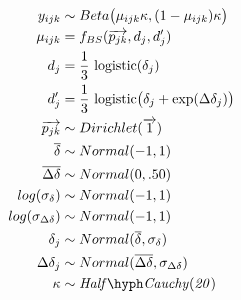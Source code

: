 \begin{align*}
  y_{ijk} &\sim Beta\big(\mu_{ijk} \kappa, (1-\mu_{ijk}) \kappa \big) \\
  \mu_{ijk} &= f_{BS}(\overrightarrow{p_{jk}}, d_j, d_j')  \\
  d_j &= \frac{1}{3} \ \text{logistic}(\delta_j) \\
  d_j' &= \frac{1}{3} \ \text{logistic}\big(\delta_j + \exp(\Delta\delta_j)\big) \\
  \overrightarrow{p_{jk}} &\sim Dirichlet(\overrightarrow{1}) \\
  \overline{\delta} &\sim Normal(-1, 1) \\
  \overline{\Delta\delta} &\sim Normal(0, .50) \\
  log(\sigma_{\delta}) &\sim Normal(-1, 1) \\
  log(\sigma_{\Delta\delta}) &\sim Normal(-1, 1) \\
  \delta_j &\sim Normal(\overline{\delta}, \sigma_{\delta}) \\
  \Delta\delta_j &\sim Normal(\overline{\Delta\delta}, \sigma_{\Delta\delta}) \\
  \kappa &\sim \mathit{Half \hyph Cauchy(20)} \\
\end{align*}

